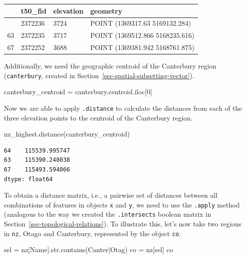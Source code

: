 \documentclass[
  letterpaper,
]{krantz}
\newenvironment{Shaded}{\begin{snugshade}}{\end{snugshade}}
\newcommand{\BuiltInTok}[1]{\textcolor[rgb]{0.00,0.23,0.31}{#1}}
\newcommand{\DecValTok}[1]{\textcolor[rgb]{0.68,0.00,0.00}{#1}}
\newcommand{\NormalTok}[1]{\textcolor[rgb]{0.00,0.23,0.31}{#1}}
\newcommand{\OperatorTok}[1]{\textcolor[rgb]{0.37,0.37,0.37}{#1}}
\newcommand{\StringTok}[1]{\textcolor[rgb]{0.13,0.47,0.30}{#1}}
\begin{document}
\begin{longtable}[]{@{}llll@{}}
\toprule\noalign{}
& t50\_fid & elevation & geometry \\
\midrule\noalign{}
\endhead
\bottomrule\noalign{}
\endlastfoot
64 & 2372236 & 3724 & POINT (1369317.63 5169132.284) \\
63 & 2372235 & 3717 & POINT (1369512.866 5168235.616) \\
67 & 2372252 & 3688 & POINT (1369381.942 5168761.875) \\
\end{longtable}

Additionally, we need the geographic centroid of the Canterbury region
(\texttt{canterbury}, created in
Section~\ref{sec-spatial-subsetting-vector}).

\begin{Shaded}
\begin{Highlighting}[]
\NormalTok{canterbury\_centroid }\OperatorTok{=}\NormalTok{ canterbury.centroid.iloc[}\DecValTok{0}\NormalTok{]}
\end{Highlighting}
\end{Shaded}

Now we are able to apply \texttt{.distance} to calculate the distances
from each of the three elevation points to the centroid of the
Canterbury region.

\begin{Shaded}
\begin{Highlighting}[]
\NormalTok{nz\_highest.distance(canterbury\_centroid)}
\end{Highlighting}
\end{Shaded}

\begin{verbatim}
64    115539.995747
63    115390.248038
67    115493.594066
dtype: float64
\end{verbatim}

To obtain a distance matrix, i.e., a pairwise set of distances between
all combinations of features in objects \texttt{x} and \texttt{y}, we
need to use the \texttt{.apply} method (analogous to the way we created
the \texttt{.intersects} boolean matrix in
Section~\ref{sec-topological-relations}). To illustrate this, let's now
take two regions in \texttt{nz}, Otago and Canterbury, represented by
the object \texttt{co}.

\begin{Shaded}
\begin{Highlighting}[]
\NormalTok{sel }\OperatorTok{=}\NormalTok{ nz[}\StringTok{\textquotesingle{}Name\textquotesingle{}}\NormalTok{].}\BuiltInTok{str}\NormalTok{.contains(}\StringTok{\textquotesingle{}Canter|Otag\textquotesingle{}}\NormalTok{)}
\NormalTok{co }\OperatorTok{=}\NormalTok{ nz[sel]}
\NormalTok{co}
\end{Highlighting}
\end{Shaded}
\end{document}
